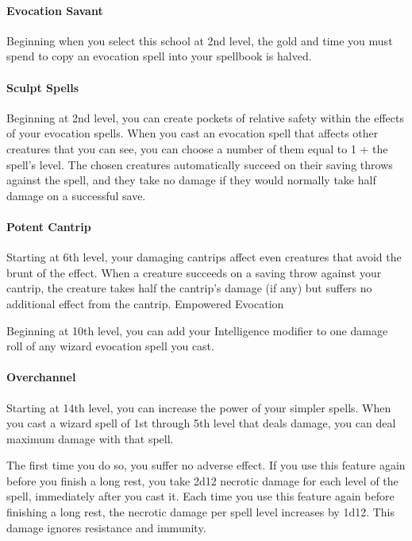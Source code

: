 \documentclass[
]{article}
\begin{document}
\hypertarget{evocation-savant}{%
\paragraph{Evocation Savant}\label{evocation-savant}}

Beginning when you select this school at 2nd level, the gold and time
you must spend to copy an evocation spell into your spellbook is halved.

\hypertarget{sculpt-spells}{%
\paragraph{Sculpt Spells}\label{sculpt-spells}}

Beginning at 2nd level, you can create pockets of relative safety within
the effects of your evocation spells. When you cast an evocation spell
that affects other creatures that you can see, you can choose a number
of them equal to 1 + the spell's level. The chosen creatures
automatically succeed on their saving throws against the spell, and they
take no damage if they would normally take half damage on a successful
save.

\hypertarget{potent-cantrip}{%
\paragraph{Potent Cantrip}\label{potent-cantrip}}

Starting at 6th level, your damaging cantrips affect even creatures that
avoid the brunt of the effect. When a creature succeeds on a saving
throw against your cantrip, the creature takes half the cantrip's damage
(if any) but suffers no additional effect from the cantrip. Empowered
Evocation

Beginning at 10th level, you can add your Intelligence modifier to one
damage roll of any wizard evocation spell you cast.

\hypertarget{overchannel}{%
\paragraph{Overchannel}\label{overchannel}}

Starting at 14th level, you can increase the power of your simpler
spells. When you cast a wizard spell of 1st through 5th level that deals
damage, you can deal maximum damage with that spell.

The first time you do so, you suffer no adverse effect. If you use this
feature again before you finish a long rest, you take 2d12 necrotic
damage for each level of the spell, immediately after you cast it. Each
time you use this feature again before finishing a long rest, the
necrotic damage per spell level increases by 1d12. This damage ignores
resistance and immunity.
\end{document}
